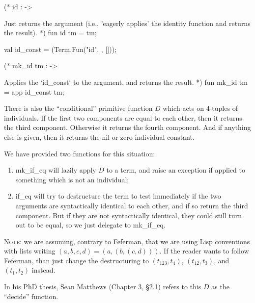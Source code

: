 \nwenddocs{}\endmoddef\nwstartdeflinemarkup{}\nwenddeflinemarkup
(* id :  -> 

Just returns the argument (i.e., 'eagerly applies' the
identity function and returns the result). *)
fun id tm = tm;

val id_const = (Term.Fun("id", , []));

(* mk_id tm :  -> 

Applies the `id_const` to the argument, and returns the
result. *)
fun mk_id tm = app id_const tm;
\eatline
{}\nwendcode{}\nwdocspar
\begin{node}
There is also the ``conditional'' primitive function $D$ which acts on
4-tuples of individuals. If the first two components are equal to each
other, then it returns the third component. Otherwise it returns the
fourth component. And if anything else is given, then it returns the
{\Tt{}nil\nwendquote} or {\Tt{}zero\nwendquote} individual constant.

We have provided two functions for this situation:
\begin{enumerate}
\item {\Tt{}mk{\_}if{\_}eq\nwendquote} will lazily apply $D$ to a term, and raise an
  exception if applied to something which is not an individual;
\item {\Tt{}if{\_}eq\nwendquote} will try to destructure the term to test immediately
  if the two arguments are syntactically identical to each other, and
  if so return the third component. But if they are not syntactically
  identical, they could still turn out to be equal, so we just
  delegate to {\Tt{}mk{\_}if{\_}eq\nwendquote}.
\end{enumerate}
\textsc{Note}: we are assuming, contrary to Feferman, that we are
using Lisp conventions with lists writing
$(a,b,c,d)=(a,(b,(c,d)))$. If the reader wants to follow Feferman,
than just change the destructuring to $(t_{123},t_{4})$,
$(t_{12},t_{3})$, and $(t_{1},t_{2})$ instead.

In his PhD thesis, Sean Matthews (Chapter 3, \S2.1) refers to this $D$
as the ``decide'' function.
\end{node}

